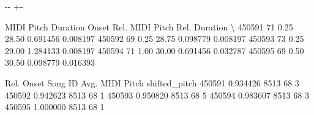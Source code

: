 \documentclass[letterpaper,10pt,english]{sphinxmanual}
\newlength\nbsphinxcodecellspacing
\begin{document}
{
\begin{sphinxVerbatim}[commandchars=\\\{\}]
\llap{\color{nbsphinxin}[45]:\,\hspace{\fboxrule}\hspace{\fboxsep}}\PYG{p}{[}\PYG{p}{]}  \PYG{p}{[}\PYG{p}{]}  \PYG{p}{[}\PYG{p}{]}
\end{sphinxVerbatim}
}

{
\begin{sphinxVerbatim}[commandchars=\\\{\}]
\llap{\color{nbsphinxin}[46]:\,\hspace{\fboxrule}\hspace{\fboxsep}}
\end{sphinxVerbatim}
}

{

\kern-\sphinxverbatimsmallskipamount\kern-\baselineskip
\kern+\FrameHeightAdjust\kern-\fboxrule
\vspace{\nbsphinxcodecellspacing}

\begin{sphinxVerbatim}[commandchars=\\\{\}]
\llap{\color{nbsphinxout}[46]:\,\hspace{\fboxrule}\hspace{\fboxsep}}        MIDI Pitch  Duration  Onset  Rel. MIDI Pitch  Rel. Duration  \textbackslash{}
450591          71      0.25  28.50         0.691456       0.008197
450592          69      0.25  28.75         0.098779       0.008197
450593          73      0.25  29.00         1.284133       0.008197
450594          71      1.00  30.00         0.691456       0.032787
450595          69      0.50  30.50         0.098779       0.016393

        Rel. Onset  Song ID  Avg. MIDI Pitch  shifted\_pitch
450591    0.934426     8513               68              3
450592    0.942623     8513               68              1
450593    0.950820     8513               68              5
450594    0.983607     8513               68              3
450595    1.000000     8513               68              1
\end{sphinxVerbatim}
}
\end{document}
